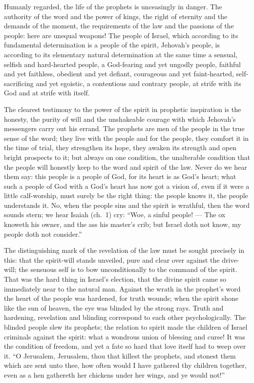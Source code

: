 \documentclass[12pt,a4paper,openany]{book}
\newcommand{\opage}[1]{\marginnote{\footnotesize\textit{[#1]}}}
\begin{document}
Humanly regarded, the life of the prophets is unceasingly in
danger. The authority of the word and the power of kings, the right of
eternity and the demands of the moment, the requirements of the law and
the passions of the people: here are unequal weapons! The people of
Israel, which according to its fundamental determination is a people of the spirit,
Jehovah's people, is according to its elementary natural determination
at the same time a sensual, selfish and hard-hearted
people, a God-fearing and yet ungodly people, faithful and
yet faithless, obedient and yet defiant, courageous and yet
\setcounter{footnote}{0}%
\opage{48}faint-hearted, self-sacrificing and yet egoistic, a contentious and contrary
people, at strife with its God and at strife with
itself.

The clearest testimony to the power of the spirit in
prophetic inspiration is the honesty, the purity of will
and the unshakeable courage with which Jehovah's
messengers carry out his errand. The prophets are men of the people
in the true sense of the word; they live with
the people and for the people, they comfort it in the time of trial,
they strengthen its hope, they awaken its strength and open
bright prospects to it; but always on one condition, the
unalterable condition that the people will honestly keep
to the word and spirit of the law. Never do we hear them say:
this people is a people of God, for its heart is as
God's heart; what such a people of God with a God's
heart has now got a vision of, even if it were
a little calf-worship, must surely be the right thing: the people
knows it, the people understands it. No, when the people
sins and the spirit is wrathful, then the word sounds stern; we
hear Isaiah (ch.~1) cry: ``Woe, a sinful people! ---
The ox knoweth his owner, and the ass his master's crib;
but Israel doth not know, my people doth not
consider.''

The distinguishing mark of the revelation of the law must be sought precisely
in this: that the spirit-will stands unveiled, pure and clear over
against the drive-will; the sensuous self is to bow
unconditionally to the command of the spirit. That was the hard thing in
Israel's election, that the divine spirit came
so immediately near to the natural man. Against
the wrath in the prophet's word the heart of the people was hardened,
for truth wounds; when the spirit shone like the sun of heaven,
the eye was blinded by the strong rays.
\setcounter{footnote}{0}%
\opage{49}Truth and hardening, revelation and blinding
correspond to each other psychologically. The blinded people
slew its prophets; the relation to spirit made
the children of Israel criminals against the spirit: what a wondrous
union of blessing and curse! It was the condition
of freedom, and yet a fate so hard that love
itself had to weep over it. ``O Jerusalem, Jerusalem, thou
that killest the prophets, and stonest them which are sent
unto thee, how often would I have gathered thy children together, even
as a hen gathereth her chickens under her
wings, and ye would not!''
\end{document}
